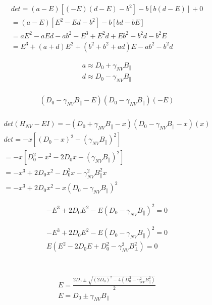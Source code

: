\begin{align*}
det = (a-E)[(-E)(d-E)-b^2]-b[b(d-E)]+0 \\
= (a-E)[E^2 - Ed -b^2] - b[bd - bE]\\
= aE^2-aEd-ab^2-E^3+E^2d+Eb^2-b^2d-b^2E \\
= E^3+(a+d)E^2+(b^2+b^2+ad)E-ab^2-b^2d
\end{align*}

\begin{align*}
a \approx D_0 + \gamma_{NV}B_\parallel \\
d \approx D_0 - \gamma_{NV}B_\parallel  \\
\end{align*}

\begin{align*}
(D_0 - \gamma_{NV}B_\parallel-E)(D_0 - \gamma_{NV}B_\parallel)(-E) \\
\end{align*}

\begin{align*}
det(H_{NV} - EI) = -(D_0 +\gamma_{NV}B_\parallel -x)(D_0 - \gamma_{NV}B_\parallel - x)(x)  \\
det = -x[(D_0 - x)^2 - (\gamma_{NV}B_\parallel)^2]\\
= -x [D_0^2 -x^2 -2D_0x - (\gamma_{NV}B_\parallel)^2]\\
= -x^3 +2D_0x^2-D_0^2x-\gamma_{NV}^2B_\parallel^2x\\
= -x^3 + 2D_0x^2 - x(D_0 -\gamma_{NV}B_\parallel)^2
\end{align*}

\begin{align*}
-E^3 + 2D_0E^2 - E(D_0 -\gamma_{NV}B_\parallel)^2 = 0
\end{align*}

\begin{align*}
-E^3 + 2D_0E^2 - E(D_0 -\gamma_{NV}B_\parallel)^2 = 0\\
E(E^2 - 2D_0E + D_0^2-\gamma_{NV}^2B_\bot^2) = 0\\
\end{align*}

\\
\begin{align*}
E = \frac{2D_0 \pm\sqrt{(2D_0)^2-4(D_0^2-\gamma_{NV}^2B_\parallel^2)}}{2}\\
E = D_0 \pm \gamma_{NV}B_\parallel
\end{align*}

